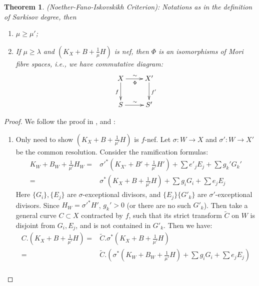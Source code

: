 \documentclass{article}
\newtheorem{thm}[defn]{Theorem}
\begin{document}
\begin{thm}\label{nfi}
  (Noether-Fano-Iskovskikh Criterion): Notations as in the definition of Sarkisov degree, then 
  \begin{enumerate}
    \item $ \mu\geqslant \mu' $;
    \item If $ \mu \geqslant \lambda $ and $ (K_X+B+\frac{1}{\mu} H) $ is nef, then $\Phi$ is an isomorphisms of Mori fibre spaces, i.e., we have commutative diagram: 
      \[ \xymatrix{
          X\ar[r]^\sim_\Phi\ar[d]_f&X'\ar[d]^{f'}\\
      S\ar[r]^\sim& S' } \]
  \end{enumerate}
\end{thm}

\begin{proof}
  We follow the proof in \cite{haconMinimalModelProgram2012},\cite{liuSarkisovProgramGeneralized2021} and \cite{cortiFactoringBirationalMaps}:
  \begin{enumerate}
    \item Only need to show $ (K_X+B+\frac{1}{\mu'}H) $ is $ f $-nef.   Let $\sigma:W\to X$ and $\sigma':W\to X'$ be the common resolution. Consider the ramification formulas:
      \[
        \begin{aligned}  
          K_W+B_W+\frac{1}{\mu'}H_W=&\sigma'^*(K_{X'}+B'+\frac{1}{\mu'}H')+\sum e'_jE_j+ \sum g_k'G_k'\\
          =&\sigma^*(K_{X}+B+\frac{1}{\mu'}H)+\sum g_iG_i+\sum e_jE_j
        \end{aligned}
      \]
      Here $ \{G_i\}, \{E_j\} $ are $ \sigma $-exceptional divisors, and $ \{E_j\}\{G'_k\} $ are $ \sigma' $-exceptional divisors. Since $H_W=\sigma'^*H' $, $ g_k'>0 $ (or there are no such $ G'_k $). Then take a general curve $ C\subset X $ contracted by $ f $, such that its strict transform $ \tilde{C} $ on $ W $ is disjoint from $ G_i, E_j $, and is not contained in $ G'_k $. Then we have:
      \[
        \begin{aligned}
          C.\left(K_X+B+\frac{1}{\mu'}H\right)=&\tilde{C}.\sigma^*\left(K_X+B+\frac{1}{\mu'}H\right)
          \\=&\tilde{C}.\left(\sigma^*\left(K_W+B_{W}+\frac{1}{\mu'}H\right)+\sum g_iG_i+\sum e_jE_j\right)\\

\end{aligned}\]
\end{enumerate}
\end{proof}
\end{document}
